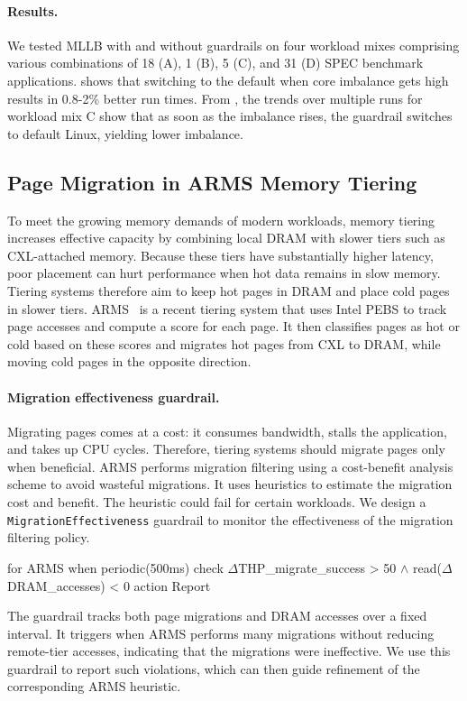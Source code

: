 \paragraph{Results.}
We tested MLLB with and without guardrails on four workload mixes comprising various combinations of 18 (A), 1 (B), 5 (C), and 31 (D) SPEC benchmark applications. 
 shows that switching to the default when core imbalance gets high results in 0.8-2\% better run times. From , the trends over multiple runs for workload mix C show that as soon as the imbalance rises, the guardrail switches to default Linux, yielding lower imbalance.

\subsection{Page Migration in ARMS Memory Tiering}\label{subsec:arms-case-study}

To meet the growing memory demands of modern workloads, memory tiering increases effective capacity by combining local DRAM with slower tiers such as CXL-attached memory. Because these tiers have substantially higher latency, poor placement can hurt performance when hot data remains in slow memory. Tiering systems therefore aim to keep hot pages in DRAM and place cold pages in slower tiers. ARMS~\cite{arms-arxiv} is a recent tiering system that uses Intel PEBS to track page accesses and compute a score for each page. It then classifies pages as hot or cold based on these scores and migrates hot pages from CXL to DRAM, while moving cold pages in the opposite direction.

\paragraph{Migration effectiveness guardrail.} Migrating pages comes at a cost: it consumes bandwidth, stalls the application, and takes up CPU cycles. Therefore, tiering systems should migrate pages only when beneficial. ARMS performs migration filtering using a cost-benefit analysis scheme to avoid wasteful migrations. It uses heuristics to estimate the migration cost and benefit. The heuristic could fail for certain workloads. We design a \texttt{MigrationEffectiveness} guardrail to monitor the effectiveness of the migration filtering policy. 
\begin{dslbox}[title={Guardrail~\theguardcount: Report migration effectiveness in ARMS}, glabel=lst:mllb]
for ARMS
when periodic(500ms)
check $\Delta$THP_migrate_success > 50 $\wedge$
      read($\Delta$DRAM_accesses) < 0
action Report
\end{dslbox}
The guardrail tracks both page migrations and DRAM accesses over a fixed interval. It triggers when ARMS performs many migrations without reducing remote-tier accesses, indicating that the migrations were ineffective. We use this guardrail to report such violations, which can then guide refinement of the corresponding ARMS heuristic.

